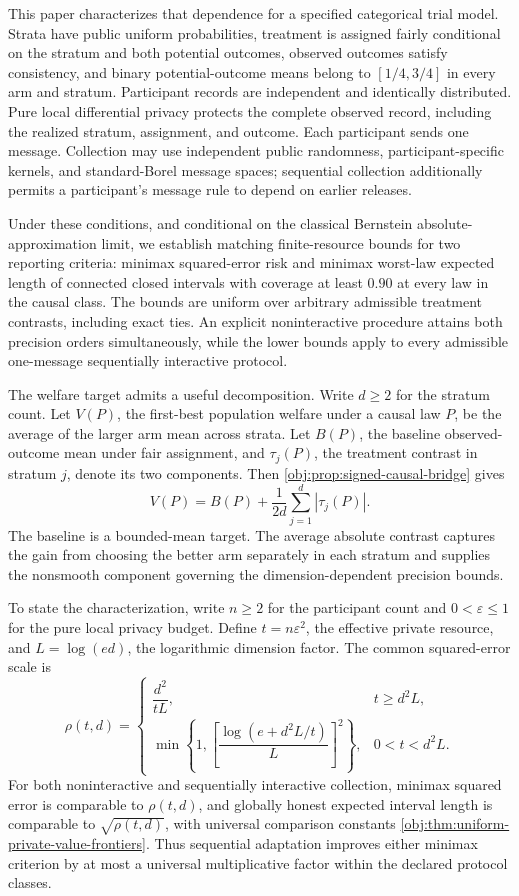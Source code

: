 This paper characterizes that dependence for a specified categorical trial model. Strata have public uniform probabilities, treatment is assigned fairly conditional on the stratum and both potential outcomes, observed outcomes satisfy consistency, and binary potential-outcome means belong to \([1/4,3/4]\) in every arm and stratum. Participant records are independent and identically distributed. Pure local differential privacy protects the complete observed record, including the realized stratum, assignment, and outcome. Each participant sends one message. Collection may use independent public randomness, participant-specific kernels, and standard-Borel message spaces; sequential collection additionally permits a participant's message rule to depend on earlier releases.

Under these conditions, and conditional on the classical Bernstein absolute-approximation limit, we establish matching finite-resource bounds for two reporting criteria: minimax squared-error risk and minimax worst-law expected length of connected closed intervals with coverage at least \(0.90\) at every law in the causal class. The bounds are uniform over arbitrary admissible treatment contrasts, including exact ties. An explicit noninteractive procedure attains both precision orders simultaneously, while the lower bounds apply to every admissible one-message sequentially interactive protocol.

The welfare target admits a useful decomposition. Write \(d\ge2\) for the stratum count. Let \(V(P)\), the first-best population welfare under a causal law \(P\), be the average of the larger arm mean across strata. Let \(B(P)\), the baseline observed-outcome mean under fair assignment, and \(\tau_j(P)\), the treatment contrast in stratum \(j\), denote its two components. Then \cref{obj:prop:signed-causal-bridge} gives
\[
V(P)=B(P)+\frac{1}{2d}\sum_{j=1}^d|\tau_j(P)|.
\]
The baseline is a bounded-mean target. The average absolute contrast captures the gain from choosing the better arm separately in each stratum and supplies the nonsmooth component governing the dimension-dependent precision bounds.

To state the characterization, write \(n\ge2\) for the participant count and \(0<\varepsilon\le1\) for the pure local privacy budget. Define \(t=n\varepsilon^2\), the effective private resource, and \(L=\log(ed)\), the logarithmic dimension factor. The common squared-error scale is
\[
\rho(t,d)=
\begin{cases}
\dfrac{d^2}{tL},&t\ge d^2L,\\[5pt]
\displaystyle\min\left\{1,
\left[\dfrac{\log(e+d^2L/t)}{L}\right]^2\right\},
&0<t<d^2L.
\end{cases}
\]
For both noninteractive and sequentially interactive collection, minimax squared error is comparable to \(\rho(t,d)\), and globally honest expected interval length is comparable to \(\sqrt{\rho(t,d)}\), with universal comparison constants \cref{obj:thm:uniform-private-value-frontiers}. Thus sequential adaptation improves either minimax criterion by at most a universal multiplicative factor within the declared protocol classes.

